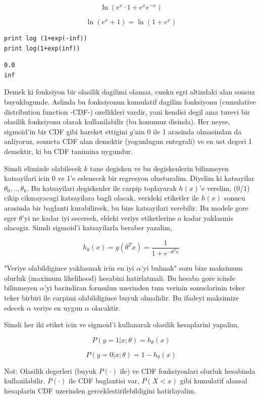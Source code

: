 \documentclass[12pt,fleqn]{article}\usepackage{../common}
\begin{document}
$$ \ln (e^{x}\cdot 1 + e^{x}e^{-x})  $$

$$ \ln (e^{x} + 1)  = \ln (1 + e^{x} )  $$

\begin{verbatim}
print log (1+exp(-inf))
print log(1+exp(inf))
\end{verbatim}

\begin{verbatim}
0.0
inf
\end{verbatim}

Demek ki fonksiyon bir olasilik dagilimi olamaz, cunku egri altindaki
alan sonsuz buyuklugunde. Aslinda bu fonksiyonun kumulatif dagilim
fonksiyonu (cumulative distribution function -CDF-) ozellikleri
vardir, yani kendisi degil ama turevi bir olasilik fonksiyonu olarak
kullanilabilir (bu konumuz disinda).
Her neyse, sigmoid'in bir CDF gibi hareket ettigini $g$'nin 0 ile 1
arasinda olmasindan da anliyoruz, sonucta CDF alan demektir
(yogunlugun entegrali) ve en ust degeri 1 demektir, ki bu CDF tanimina
uygundur.

Simdi elimizde olabilecek $k$ tane degisken ve bu degiskenlerin
bilinmeyen katsayilari icin 0 ve 1'e eslenecek bir regresyon
olusturalim. Diyelim ki katsayilar $\theta_0,..,\theta_k$. Bu
katsayilari degiskenler ile carpip toplayarak $h(x)$'e verelim, (0/1)
cikip cikmayacagi katsayilara bagli olacak, verideki etiketler ile
$h(x)$ sonucu arasinda bir baglanti kurabilirsek, bu bize katsayilari
verebilir. Bu modele gore eger $\theta$'yi ne kadar iyi secersek,
eldeki veriye etiketlerine o kadar yaklasmis olacagiz. Simdi sigmoid'i
katsayilarla beraber yazalim,

$$ h_\theta(x) = g(\theta^T x) = \frac{1}{1+e^{-\theta^T x}} $$

"Veriye olabildigince yaklasmak icin en iyi $\alpha$'yi bulmak" sozu
bize maksimum olurluk (maximum likelihood) hesabini hatirlatmali. Bu
hesaba gore icinde bilinmeyen $\alpha$'yi barindiran formulun
uzerinden tum verinin sonuclarinin teker teker birbiri ile carpimi
olabildigince buyuk olmalidir. Bu ifadeyi maksimize edecek $\alpha$
veriye en uygun $\alpha$ olacaktir.

Simdi her iki etiket icin ve sigmoid'i kullanarak olasilik hesaplarini
yapalim,

$$ P(y=1 | x;\theta) = h_\theta(x) $$

$$ P(y=0 | x;\theta) = 1 - h_\theta(x) $$

Not: Olasilik degerleri (buyuk $P(\cdot)$ ile) ve CDF fonksiyonlari
olurluk hesabinda kullanilabilir. $P(\cdot)$ ile CDF baglantisi var,
$P(X<x)$ gibi kumulatif alansal hesaplarin CDF uzerinden
gerceklestirilebildigini hatirlayalim.
\end{document}
